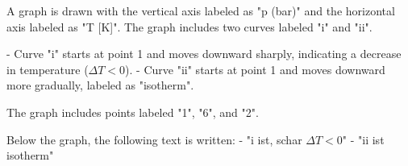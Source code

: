 A graph is drawn with the vertical axis labeled as "p (bar)" and the horizontal axis labeled as "T [K]". The graph includes two curves labeled "i" and "ii".  

- Curve "i" starts at point 1 and moves downward sharply, indicating a decrease in temperature (\( \Delta T < 0 \)).  
- Curve "ii" starts at point 1 and moves downward more gradually, labeled as "isotherm".  

The graph includes points labeled "1", "6", and "2".  

Below the graph, the following text is written:  
- "i ist, schar \( \Delta T < 0 \)"  
- "ii ist isotherm"